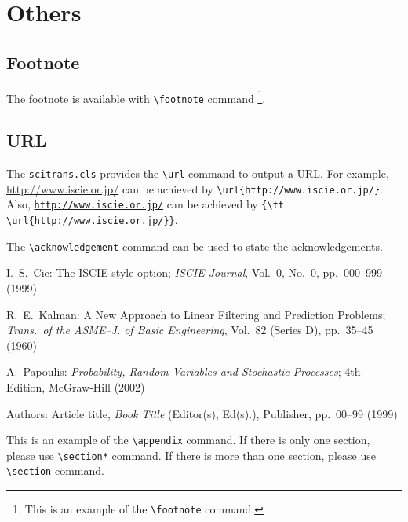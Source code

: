 \section{Others}
\subsection{Footnote}
The footnote is available with \verb+\footnote+ command%
\footnote{This is an example of the {\tt \textbackslash footnote} command.}.

\subsection{URL}
The {\tt scitrans.cls} provides the \verb+\url+ command to output a URL. 
For example, \url{http://www.iscie.or.jp/} can be achieved by 
\verb+\url{http://www.iscie.or.jp/}+. 
Also, {\tt \url{http://www.iscie.or.jp/}}  can be achieved by 
\verb+{\tt \url{http://www.iscie.or.jp/}}+. 


\acknowledgement
The \verb+\acknowledgement+ command can be used to state the acknowledgements. 


\begin{thebibliography}{9}
        I.\ S.\ Cie: 
        The ISCIE style option; 
        {\it ISCIE Journal}, Vol.~0, No.~0, pp.~000--999 (1999)

        R.\ E.\ Kalman: 
        A New Approach to Linear Filtering and Prediction Problems; 
        {\it Trans.\ of the ASME--J. of Basic Engineering}, Vol.~82 (Series D), 
        pp.~35--45 (1960)

        A.\ Papoulis: 
        {\it Probability, Random Variables and Stochastic Processes}; 
        4th Edition, McGraw-Hill (2002)

        Authors:
        Article title, {\it Book Title} (Editor(s), Ed(s).), Publisher,
        pp.~00--99 (1999)
\end{thebibliography}



%
\appendix

This is an example of the \verb+\appendix+ command.
If there is only one section, please use \verb+\section*+ command. 
If there is more than one section, please use \verb+\section+ command.


